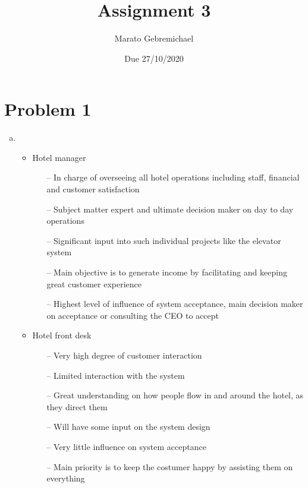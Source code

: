 \documentclass{article}
\title{Assignment 3}
\author{Marato Gebremichael}
\date{Due 27/10/2020}
\begin{document}
   \maketitle
   
\section*{Problem 1}   

\begin{enumerate}[(a)]

	\item
   
	\begin{itemize}
		\item Hotel manager
		
			\begin{enumerate}
				\item[--] In charge of overseeing all hotel operations including staff, financial and customer satisfaction
				\item[--] Subject matter expert and ultimate decision maker on day to day operations 
				\item[--] Significant input into such individual projects like the elevator system		
				\item[--] Main objective is to generate income by facilitating and keeping great customer experience 
				\item[--] Highest level of influence of system acceptance, main decision maker on acceptance or consulting the CEO to accept
			\end{enumerate}			

		\item Hotel front desk

			\begin{enumerate}
				\item[--] Very high degree of customer interaction
				\item[--] Limited interaction with the system 
				\item[--] Great understanding on how people flow in and around the hotel, as they direct them
				\item[--] Will have some input on the system design 
				\item[--] Very little influence on system acceptance
				\item[--] Main priority is to keep the costumer happy by assisting them on everything   
			\end{enumerate}


\end{itemize}
\end{enumerate}
\end{document}
